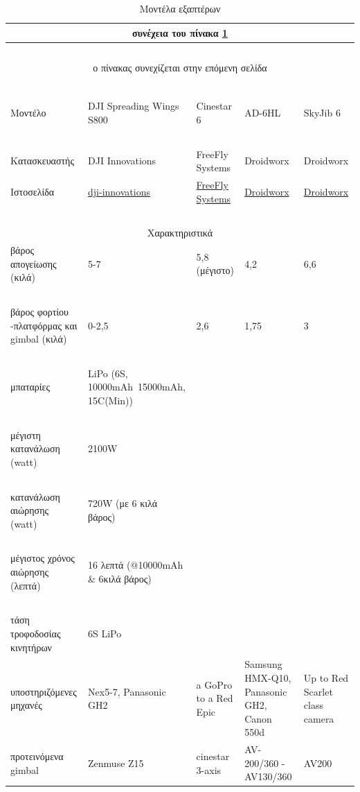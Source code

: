 \documentclass[a4paper, 12pt, twoside]{report}
\begin{document}
{{{{{{			\begin{landscape}	
			\setlength\LTleft{0pt}            %
			\setlength\LTright{0pt}           %
	
			\begin{longtable} { m{3cm} m{3.5cm} m{3.5cm} m{3.5cm} m{3.5cm} }
					\caption [Μοντέλα εξαπτέρων]{Μοντέλα εξαπτέρων}
					\label{πιν.:Μοντέλα εξαπτέρων}\\
					\hline
					\endfirsthead
					\multicolumn{5}{c}{συνέχεια του πίνακα \ref{πιν.:Μοντέλα εξαπτέρων}}\\
					\hline
					~\\
					\endhead
					\hline
					\multicolumn{5}{c}{ο πίνακας συνεχίζεται στην επόμενη σελίδα}\\
					\endfoot
					\multicolumn{5}{c}{ολοκληρώθηκε ο πίνακας \ref{πιν.:Μοντέλα εξαπτέρων}}\\
					\endlastfoot
					~\\
					Μοντέλο & DJI Spreading Wings S800 & Cinestar 6 & AD-6HL & SkyJib 6\\
					\hdashline
					~\\
					Κατασκευαστής & DJI Innovations & FreeFly Systems & Droidworx & Droidworx\\
					Ιστοσελίδα & \href{http://www.dji-innovations.com/products/spreading-wings-s800/overview/}{dji-innovations} & \href{http://www.freeflysystems.com/products/cinestar-6.php}{FreeFly Systems} & \href{http://www.droidworx.com.au/ADseries.html}{Droidworx} & \href{http://www.droidworx.com.au/skyjib.html}{Droidworx}\\
					\hdashline
					~\\
					\multicolumn{5}{c}{Χαρακτηριστικά}\\
					\hdashline
					βάρος απογείωσης (κιλά) & 5-7 & 5,8 (μέγιστο) & 4,2 & 6,6\\
					~\\
					βάρος φορτίου -πλατφόρμας και gimbal (κιλά) & 0-2,5 & 2,6 & 1,75 & 3\\
					~\\
					μπαταρίες & LiPo (6S, 10000mAh~15000mAh, 15C(Min)) & & & \\
					~\\
					μέγιστη κατανάλωση (watt) & 2100W & & & \\
					~\\
					κατανάλωση αιώρησης (watt) & 720W (με 6 κιλά βάρος) & & & \\
					~\\
					μέγιστος χρόνος αιώρησης (λεπτά) & 16 λεπτά (@10000mAh \& 6κιλά βάρος) & & & \\
					~\\
					τάση τροφοδοσίας κινητήρων & 6S LiPo & & & \\
					υποστηριζόμενες μηχανές  & Nex5-7, Panasonic GH2 & a GoPro to a Red Epic & Samsung HMX-Q10, Panasonic GH2, Canon 550d & Up to Red Scarlet class camera\\
					προτεινόμενα gimbal & Zenmuse Z15 & cinestar 3-axis & AV-200/360 - AV130/360 & AV200\\
					\hline
				\end{longtable}
				\end{landscape}
			
}}}}}}
\end{document}
